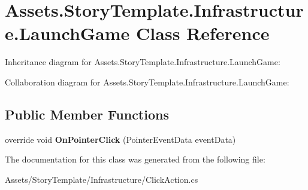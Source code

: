 \hypertarget{classAssets_1_1StoryTemplate_1_1Infrastructure_1_1LaunchGame}{}\section{Assets.\+Story\+Template.\+Infrastructure.\+Launch\+Game Class Reference}
\label{classAssets_1_1StoryTemplate_1_1Infrastructure_1_1LaunchGame}


Inheritance diagram for Assets.\+Story\+Template.\+Infrastructure.\+Launch\+Game\+:


Collaboration diagram for Assets.\+Story\+Template.\+Infrastructure.\+Launch\+Game\+:
\subsection*{Public Member Functions}
\begin{DoxyCompactItemize}
\item 
override void {\bfseries On\+Pointer\+Click} (Pointer\+Event\+Data event\+Data)\hypertarget{classAssets_1_1StoryTemplate_1_1Infrastructure_1_1LaunchGame_a1c56f9a7b7c92e5a1dc7878e763ef1dc}{}\label{classAssets_1_1StoryTemplate_1_1Infrastructure_1_1LaunchGame_a1c56f9a7b7c92e5a1dc7878e763ef1dc}

\end{DoxyCompactItemize}


The documentation for this class was generated from the following file\+:\begin{DoxyCompactItemize}
\item 
Assets/\+Story\+Template/\+Infrastructure/Click\+Action.\+cs\end{DoxyCompactItemize}
